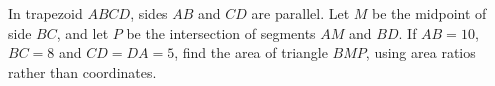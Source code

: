 In trapezoid $ABCD$, sides $AB$ and $CD$ are parallel. Let $M$ be the midpoint of side $BC$, and let $P$ be the intersection of segments $AM$ and $BD$. If $AB=10$, $BC=8$ and $CD=DA=5$, find the area of triangle $BMP$, using area ratios rather than coordinates.

